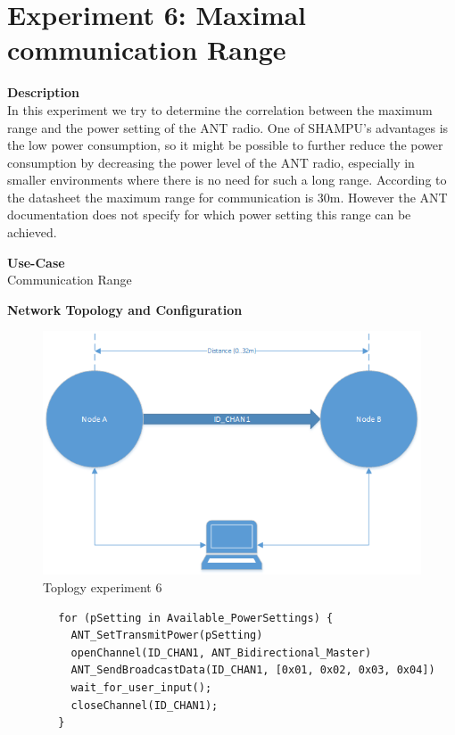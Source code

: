 \section{Experiment 6: Maximal communication Range}
\begin{description} 
	\item{\textbf{Description}} \hfill \\  In this experiment we try to determine the correlation between the maximum range and the power setting of the ANT radio. One of SHAMPU's advantages is the low power consumption, so it might be possible to further reduce the power consumption by decreasing the power level of the ANT radio, especially in smaller environments where there is no need for such a long range. According to the datasheet the maximum range for communication is 30m. However the ANT documentation does not specify for which power setting this range can be achieved. 

	\item{\textbf{Use-Case}} \hfill \\ Communication Range		
	\item{\textbf{Network Topology and Configuration}} \hfill \\ 
	\begin{figure}[H]
		\centering
		\includegraphics[scale=0.75]{./pics/exp6_topo.png}
		\caption{Toplogy experiment 6}
	\end{figure}
	
	\begin{code}[H]
		\begin{verbatim}
		for (pSetting in Available_PowerSettings) {
		  ANT_SetTransmitPower(pSetting)
		  openChannel(ID_CHAN1, ANT_Bidirectional_Master)
		  ANT_SendBroadcastData(ID_CHAN1, [0x01, 0x02, 0x03, 0x04])
		  wait_for_user_input();
		  closeChannel(ID_CHAN1);
		}
		\end{verbatim}
		\caption{max communication range (Master)}\label{lst:mExp6}
	\end{code}
	

\end{description}
